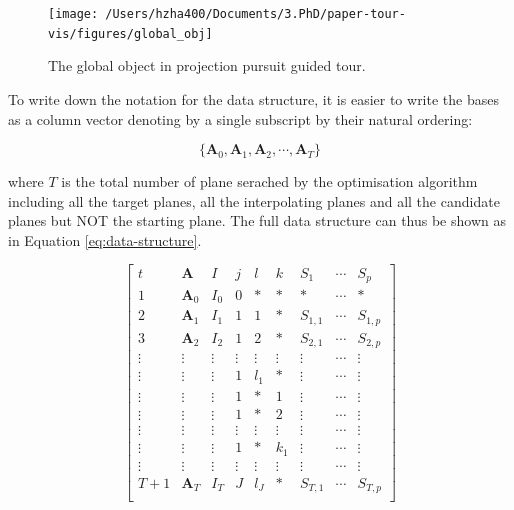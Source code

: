 \documentclass[12pt]{article}
\begin{document}
\begin{figure}
\texttt{[image: /Users/hzha400/Documents/3.PhD/paper-tour-vis/figures/global\_obj]} \caption{\label{glb-obj}The global object in projection pursuit guided tour.}\label{fig:glb-obj}
\end{figure}

To write down the notation for the data structure, it is easier to write
the bases as a column vector denoting by a single subscript by their
natural ordering:

\begin{equation}
\{
\mathbf{A}_0, 
\mathbf{A}_1, 
\mathbf{A}_2, 
\cdots,
\mathbf{A}_T
\label{vector-basis}
\}
\end{equation}

where \(T\) is the total number of plane serached by the optimisation
algorithm including all the target planes, all the interpolating planes
and all the candidate planes but NOT the starting plane. The full data
structure can thus be shown as in Equation \ref{eq:data-structure}.

\begin{equation}
\left[
\begin{array}{c|cc|ccc|ccc}
t & \mathbf{A} & I & j &  l  & k & S_{1}& \cdots & S_{p}\\
\hline
1 & \mathbf{A}_0 & I_0 & 0 & \ast & \ast & \ast & \cdots & \ast\\
\hline
2 & \mathbf{A}_1 & I_1 & 1 & 1 & \ast & S_{1, 1} & \cdots & S_{1, p}\\
3 & \mathbf{A}_2 & I_2 & 1 & 2 & \ast & S_{2, 1} & \cdots & S_{2, p}\\
\vdots & \vdots &\vdots & \vdots &\vdots & \vdots &\vdots &\cdots &\vdots\\
\vdots & \vdots & \vdots & 1 & l_1 & \ast & \vdots &  \cdots & \vdots\\
\hline
\vdots &\vdots & \vdots & 1 & \ast & 1& \vdots &  \cdots & \vdots\\
\vdots &\vdots &\vdots& 1 & \ast & 2& \vdots& \cdots & \vdots\\
\vdots &\vdots &\vdots &\vdots  &\vdots & \vdots &\vdots &\cdots &\vdots \\
\vdots &\vdots &\vdots & 1 & \ast & k_1&\vdots & \cdots & \vdots\\
\hline
\vdots &\vdots &\vdots &\vdots  &\vdots & \vdots &\vdots &\cdots &\vdots \\
T+1 & \mathbf{A}_T & I_T & J &  l_J & \ast & S_{T, 1}& \cdots & S_{T, p}\\
\end{array}
\right]
\label{eq:data-structure}
\end{equation}
\end{document}
